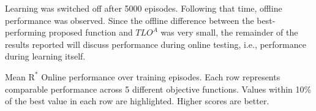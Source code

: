 Learning was switched off after 5000 episodes. Following that time, offline performance was observed. Since the offline difference between the best-performing proposed function and $TLO^A$ was very small, the remainder of the results reported will discuss performance during online testing, i.e., performance during learning itself.%


\begin{table}[t]
\scriptsize
  \caption{Mean $\text{R}^*$ Online performance over training episodes. Each row represents comparable performance across 5 different objective functions. Values within 10\% of the best value in each row are highlighted. Higher scores are better.}
  \label{tab:mean_r_star_performance}

\end{table}

 


